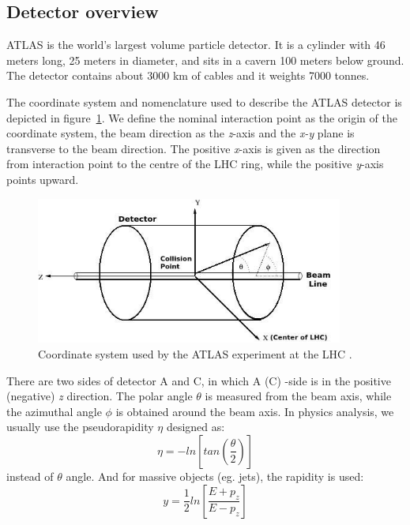 \subsection{Detector overview}

ATLAS is the world's largest volume particle detector.
It is a cylinder with 46 meters long, 25 meters in diameter, and sits in a cavern 100 meters below ground.
The detector contains about 3000 km of cables and it weights 7000 tonnes.

The coordinate system and nomenclature used to describe the ATLAS detector \cite{Collaboration_2008} is depicted in figure~\ref{fig:coordinate}. We define the nominal interaction point as the origin of the coordinate system, the beam direction as the \textit{z}-axis and the \textit{x-y} plane is transverse to the beam direction.
The positive \textit{x}-axis is given as the direction from interaction point to the centre of the LHC ring, 
while the positive \textit{y}-axis points upward.
\begin{figure}[!htb]
  \centering
  \includegraphics[width=0.9\textwidth]{figures/Detector/Coordinate_system_atlas.png}
  \caption{Coordinate system used by the ATLAS experiment at the LHC \cite{Perez:phdthesis}.}
  \label{fig:coordinate}
\end{figure}
There are two sides of detector A and C, in which A (C) -side is in the positive (negative) \textit{z} direction.
The polar angle $\theta$ is measured from the beam axis, while the azimuthal angle $\phi$ is obtained around the beam axis.
In physics analysis, we usually use the pseudorapidity $\eta$ designed as:
\begin{equation}
    \eta = - ln \left[ tan\left( \frac{\theta}{2}\right) \right]
\end{equation}
instead of $\theta$ angle. 
And for massive objects (eg. jets), the rapidity is used:
\begin{equation}
    y = \frac{1}{2} ln \left[ \frac{E+p_{z}}{E-p_{z}} \right]
\end{equation}


